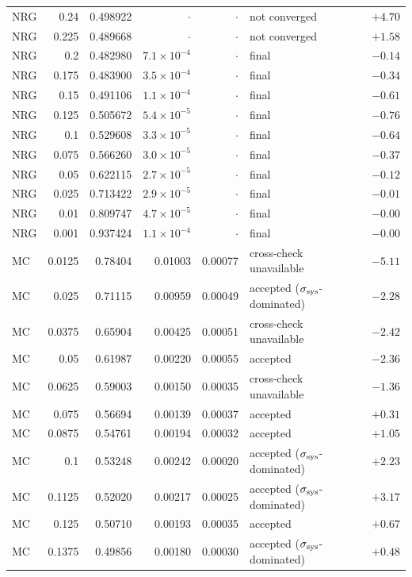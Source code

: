 \documentclass[11pt,a4paper]{article}
\numberwithin{equation}{section}
\newcommand{\sci}[2]{#1\times10^{#2}}
\begin{document}
{\begin{longtable}{@{}l r r r r l r@{}}
NRG & 0.24 & 0.498922 & $\cdot$ & $\cdot$ & not converged & $+4.70$\\
NRG & 0.225 & 0.489668 & $\cdot$ & $\cdot$ & not converged & $+1.58$\\
NRG & 0.2 & 0.482980 & $\sci{7.1}{-4}$ & $\cdot$ & final & $-0.14$\\
NRG & 0.175 & 0.483900 & $\sci{3.5}{-4}$ & $\cdot$ & final & $-0.34$\\
NRG & 0.15 & 0.491106 & $\sci{1.1}{-4}$ & $\cdot$ & final & $-0.61$\\
NRG & 0.125 & 0.505672 & $\sci{5.4}{-5}$ & $\cdot$ & final & $-0.76$\\
NRG & 0.1 & 0.529608 & $\sci{3.3}{-5}$ & $\cdot$ & final & $-0.64$\\
NRG & 0.075 & 0.566260 & $\sci{3.0}{-5}$ & $\cdot$ & final & $-0.37$\\
NRG & 0.05 & 0.622115 & $\sci{2.7}{-5}$ & $\cdot$ & final & $-0.12$\\
NRG & 0.025 & 0.713422 & $\sci{2.9}{-5}$ & $\cdot$ & final & $-0.01$\\
NRG & 0.01 & 0.809747 & $\sci{4.7}{-5}$ & $\cdot$ & final & $-0.00$\\
NRG & 0.001 & 0.937424 & $\sci{1.1}{-4}$ & $\cdot$ & final & $-0.00$\\
MC & 0.0125 & 0.78404 & 0.01003 & 0.00077 & cross-check unavailable & $-5.11$\\
MC & 0.025 & 0.71115 & 0.00959 & 0.00049 & accepted ($\sigma_{\rm sys}$-dominated) & $-2.28$\\
MC & 0.0375 & 0.65904 & 0.00425 & 0.00051 & cross-check unavailable & $-2.42$\\
MC & 0.05 & 0.61987 & 0.00220 & 0.00055 & accepted & $-2.36$\\
MC & 0.0625 & 0.59003 & 0.00150 & 0.00035 & cross-check unavailable & $-1.36$\\
MC & 0.075 & 0.56694 & 0.00139 & 0.00037 & accepted & $+0.31$\\
MC & 0.0875 & 0.54761 & 0.00194 & 0.00032 & accepted & $+1.05$\\
MC & 0.1 & 0.53248 & 0.00242 & 0.00020 & accepted ($\sigma_{\rm sys}$-dominated) & $+2.23$\\
MC & 0.1125 & 0.52020 & 0.00217 & 0.00025 & accepted ($\sigma_{\rm sys}$-dominated) & $+3.17$\\
MC & 0.125 & 0.50710 & 0.00193 & 0.00035 & accepted & $+0.67$\\
MC & 0.1375 & 0.49856 & 0.00180 & 0.00030 & accepted ($\sigma_{\rm sys}$-dominated) & $+0.48$\\

\end{longtable}}
\end{document}
